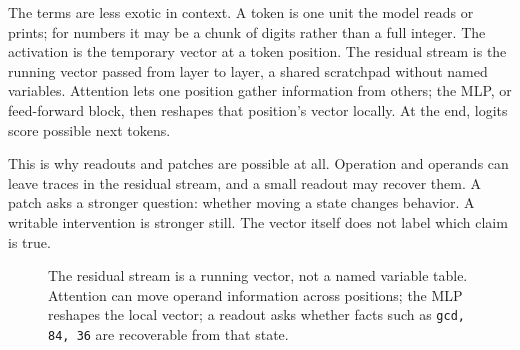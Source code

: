 \documentclass[acmsmall,screen,nonacm]{acmart}
\begin{document}
The terms are less exotic in context. A token is one unit the model reads or
prints; for numbers it may be a chunk of digits rather than a full integer. The
activation is the temporary vector at a token position. The residual stream is
the running vector passed from layer to layer, a shared scratchpad without named
variables. Attention lets one position gather information from others; the MLP,
or feed-forward block, then reshapes that position's vector locally. At the end,
logits score possible next tokens.

This is why readouts and patches are possible at all. Operation and operands can
leave traces in the residual stream, and a small readout may recover them. A
patch asks a stronger question: whether moving a state changes behavior. A
writable intervention is stronger still. The vector itself does not label which
claim is true.

\begin{figure}[t]
  \centering
  \caption{The residual stream is a running vector, not a named variable table.
  Attention can move operand information across positions; the MLP reshapes the
  local vector; a readout asks whether facts such as \texttt{gcd, 84, 36} are
  recoverable from that state.}
\end{figure}
\end{document}
